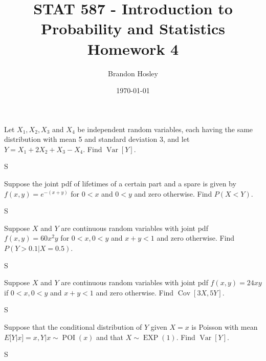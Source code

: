 \documentclass[answers]{exam}
\title{STAT 587 - Introduction to Probability and Statistics%
	\\ Homework 4}
\author{Brandon Hosley}
\date{\today}
\begin{document}
\maketitle
\begin{questions}

\question 
Let \(X_1,X_2,X_3\) and \(X_4\) be independent random variables, each having the same distribution with mean 5 and standard deviation 3, and let \(Y = X_1+2X_2+X_3-X_4\). Find \(\operatorname{Var}[Y]\).
\begin{solution}
	S
\end{solution}

\question 
Suppose the joint pdf of lifetimes of a certain part and a spare is given by \(f(x,y) =e^{-(x+y)}\)
for \(0 < x\) and \(0 < y\) and zero otherwise. Find \(P(X<Y)\).
\begin{solution}
	S
\end{solution}

\question 
Suppose $X$ and $Y$ are continuous random variables with joint pdf \(f(x,y) = 60x^2y\)
for \(0<x,0<y\) and \(x+y<1\) and zero otherwise. Find \(P(Y > 0.1 | X = 0.5)\).
\begin{solution}
	S
\end{solution}

\question 
Suppose $X$ and $Y$ are continuous random variables with joint pdf \(f(x,y) = 24xy\)
if \(0<x,0<y\) and \(x+y<1\) and zero otherwise. Find \(\operatorname{Cov}[3X,5Y]\).
\begin{solution}
	S
\end{solution}

\question 
Suppose that the conditional distribution of $Y$ given $X=x$ is Poisson with mean 
\(E[Y|x] = x , Y|x\sim\operatorname{POI}(x)\) and that \(X\sim\operatorname{EXP}(1)\). Find \(\operatorname{Var}[Y]\).
\begin{solution}
	S
\end{solution}


\end{questions}
\end{document}

